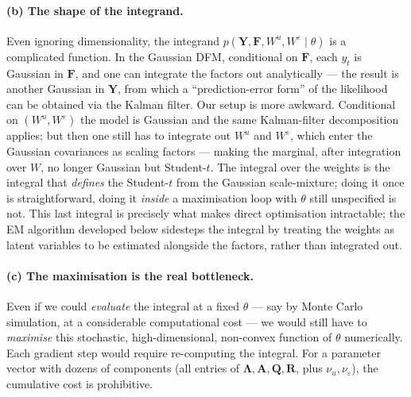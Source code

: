 \documentclass[11pt, a4paper, oneside]{article}
\newcommand{\mY}{\mathbf{Y}}
\newcommand{\mF}{\mathbf{F}}
\newcommand{\mL}{\boldsymbol{\Lambda}}
\newcommand{\mA}{\mathbf{A}}
\newcommand{\mR}{\mathbf{R}}
\newcommand{\mQ}{\mathbf{Q}}
\begin{document}
\paragraph{(b) The shape of the integrand.}
Even ignoring dimensionality, the integrand
$p(\mY, \mF, W^u, W^\varepsilon \mid \theta)$ is a complicated function.
In the Gaussian DFM, conditional on $\mF$, each $y_t$ is Gaussian in
$\mF$, and one can integrate the factors out analytically — the result
is another Gaussian in $\mY$, from which a ``prediction-error form'' of
the likelihood can be obtained via the Kalman filter. Our setup is more
awkward. Conditional on $(W^u, W^\varepsilon)$ the model is Gaussian and
the same Kalman-filter decomposition applies; but then one still has to
integrate out $W^u$ and $W^\varepsilon$, which enter the Gaussian
covariances as scaling factors — making the marginal, after integration
over $W$, no longer Gaussian but Student-$t$. The integral over the
weights is the integral that \emph{defines} the Student-$t$ from the
Gaussian scale-mixture; doing it once is straightforward, doing it
\emph{inside} a maximisation loop with $\theta$ still unspecified is not.
This last integral is precisely what makes direct optimisation intractable; 
the EM algorithm developed below sidesteps the integral by treating the weights 
as latent variables to be estimated alongside the factors, rather than integrated out. 


\paragraph{(c) The maximisation is the real bottleneck.}
Even if we could \emph{evaluate} the integral at a fixed $\theta$ — say
by Monte Carlo simulation, at a considerable computational cost — we
would still have to \emph{maximise} this stochastic, high-dimensional,
non-convex function of $\theta$ numerically. Each gradient step would
require re-computing the integral. For a parameter vector with dozens of
components (all entries of $\mL, \mA, \mQ, \mR$, plus $\nu_u,
\nu_\varepsilon$), the cumulative cost is prohibitive.
\end{document}
